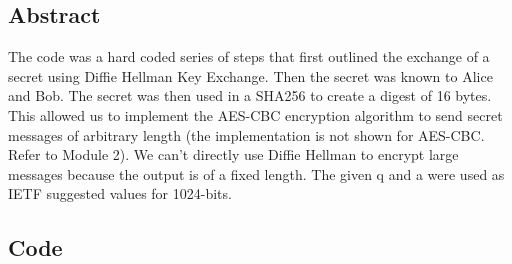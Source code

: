 \documentclass[11pt]{article}
\begin{document}
\subsection*{Abstract}

The code was a hard coded series of steps that first outlined the exchange of a secret using Diffie Hellman Key Exchange. Then the secret was known to Alice and Bob. The secret was then used in a SHA256 to create a digest of 16 bytes. This allowed us to implement the AES-CBC encryption algorithm to send secret messages of arbitrary length (the implementation is not shown for AES-CBC. Refer to Module 2). We can’t directly use Diffie Hellman to encrypt large messages because the output is of a fixed length. The given q and a were used as IETF suggested values for 1024-bits.

\subsection*{Code}
\end{document}
